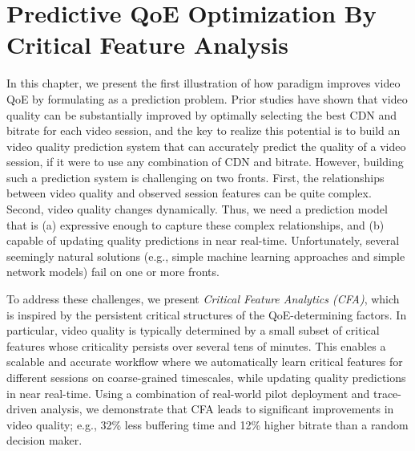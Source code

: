 \chapter{Predictive QoE Optimization By Critical Feature Analysis}
\label{ch:cfa}

\newcommand{\dda}{{CFA}\xspace}
\newcommand{\system}{{\dda}\xspace}
\newcommand{\ControlPlane}{{global optimization system}\xspace}

In this chapter, we present the first illustration of how \ddn paradigm 
improves video QoE by formulating \ddn as a prediction problem. 
Prior studies have shown that video quality can be substantially improved
by optimally selecting the best CDN and bitrate for each video session, 
and the key to realize this potential is to build an video quality prediction
system that can accurately predict the quality of a video session, if it were
to use any combination of CDN and bitrate.
However, building such a prediction system is challenging on two fronts. 
First, the relationships between video quality and observed 
session features can be quite complex. Second, video quality changes 
dynamically. 
Thus, we need a prediction model that is 
(a) expressive enough to capture these complex relationships, 
and (b) capable of updating quality predictions in near 
real-time. 
Unfortunately, several seemingly natural solutions (e.g., 
simple machine learning approaches and simple network models) fail on 
one or more fronts.

To address these challenges, we present {\em Critical 
Feature Analytics (\dda)}, which is inspired by  the persistent critical 
structures of the QoE-determining factors. 
In particular, video quality is typically determined by a small subset of 
critical features whose criticality persists over several tens of minutes.
This enables a scalable and accurate workflow where 
we automatically learn critical features for different 
sessions on coarse-grained timescales, while updating 
quality predictions in  near real-time. 
Using a  combination of real-world pilot deployment 
and trace-driven analysis, we demonstrate that \dda 
leads to significant improvements in video quality; e.g., 32\% less 
buffering time and 12\% higher bitrate than a random decision maker.


